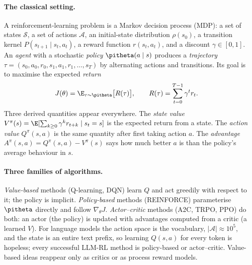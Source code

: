 \paragraph{The classical setting.} A reinforcement-learning problem is a Markov decision
process (MDP): a set of states $\mathcal{S}$, a set of actions $\mathcal{A}$, an initial-state
distribution $\rho(s_0)$, a transition kernel $P(s_{t+1}\mid s_t,a_t)$, a reward function
$r(s_t,a_t)$, and a discount $\gamma\in[0,1]$. An \emph{agent} with a stochastic
\emph{policy} $\pitheta(a\mid s)$ produces a \emph{trajectory}
$\tau=(s_0,a_0,r_0,s_1,a_1,r_1,\dots,s_T)$ by alternating actions and transitions. Its goal is
to maximise the expected \emph{return}
\begin{equation}
J(\theta)=\E_{\tau\sim\pitheta}\big[R(\tau)\big],\qquad R(\tau)=\sum_{t=0}^{T-1}\gamma^t r_t .
\label{eq:pg:J}
\end{equation}
Three derived quantities appear everywhere. The \emph{state value}
$V^\pi(s)=\E[\sum_{k\ge0}\gamma^k r_{t+k}\mid s_t=s]$ is the expected return from a state. The
\emph{action value} $Q^\pi(s,a)$ is the same quantity after first taking action $a$. The
\emph{advantage} $A^\pi(s,a)=Q^\pi(s,a)-V^\pi(s)$ says how much better $a$ is than the
policy's average behaviour in $s$.

\paragraph{Three families of algorithms.} \emph{Value-based} methods (Q-learning, DQN) learn
$Q$ and act greedily with respect to it; the policy is implicit. \emph{Policy-based} methods
(REINFORCE) parameterise $\pitheta$ directly and follow $\nabla_\theta J$. \emph{Actor--critic}
methods (A2C, TRPO, PPO) do both: an actor (the policy) is updated with advantages computed
from a critic (a learned $V$). For language models the action space is the vocabulary,
$|\mathcal{A}|\approx10^5$, and the state is an entire text prefix, so learning $Q(s,a)$
for every token is hopeless; every successful LLM-RL method is policy-based or
actor--critic. Value-based ideas reappear only as critics or as process reward models.

